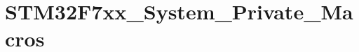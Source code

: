 \hypertarget{group___s_t_m32_f7xx___system___private___macros}{}\section{S\+T\+M32\+F7xx\+\_\+\+System\+\_\+\+Private\+\_\+\+Macros}
\label{group___s_t_m32_f7xx___system___private___macros}
